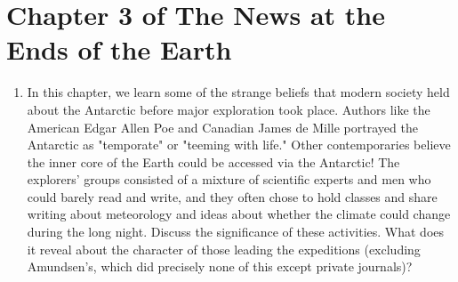 \documentclass{article}
\begin{document}
\section{Chapter 3 of The News at the Ends of the Earth}
\begin{enumerate}
\item In this chapter, we learn some of the strange beliefs that modern society held about the Antarctic before major exploration took place.  Authors like the American Edgar Allen Poe and Canadian James de Mille portrayed the Antarctic as "temporate" or "teeming with life."  Other contemporaries believe the inner core of the Earth could be accessed via the Antarctic!  The explorers' groups consisted of a mixture of scientific experts and men who could barely read and write, and they often chose to hold classes and share writing about meteorology and ideas about whether the climate could change during the long night.  Discuss the significance of these activities.  What does it reveal about the character of those leading the expeditions (excluding Amundsen's, which did precisely none of this except private journals)?  
\end{enumerate}
\end{document}

